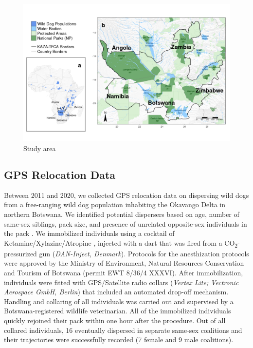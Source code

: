 \documentclass[abstract=on,10pt,a4paper,bibliography=totocnumbered]{article}
\begin{document}
\begin{figure}[htbp]
  \begin{center}
    \includegraphics[width = \textwidth]{99_StudyArea.png}
    \caption{Study area}
    \label{StudyArea}
  \end{center}
\end{figure}

\subsection{GPS Relocation Data}
Between 2011 and 2020, we collected GPS relocation data on dispersing wild dogs
from a free-ranging wild dog population inhabiting the Okavango Delta in
northern Botswana. We identified potential dispersers based on age, number of
same‐sex siblings, pack size, and presence of unrelated opposite-sex individuals
in the pack \citep{McNutt.1996, Behr.2020}. We immobilized individuals using a
cocktail of Ketamine/Xylazine/Atropine \citep{Osofsky.1996, Cozzi.2020},
injected with a dart that was fired from a CO\textsubscript{2}-pressurized gun
(\textit{DAN-Inject, Denmark}). Protocols for the anesthization protocols were
approved by the Ministry of Environment, Natural Resources Conservation and
Tourism of Botswana (permit EWT 8/36/4 XXXVI). After immobilization, individuals
were fitted with GPS/Satellite radio collars (\textit{Vertex Lite; Vectronic
Aerospace GmbH, Berlin}) that included an automated drop-off mechanism. Handling
and collaring of all individuals was carried out and supervised by a
Botswana-registered wildlife veterinarian. All of the immobilized individuals
quickly rejoined their pack within one hour after the procedure. Out of all
collared individuals, 16 eventually dispersed in separate same-sex coalitions
and their trajectories were successfully recorded (7 female and 9 male
coalitions).
\end{document}
